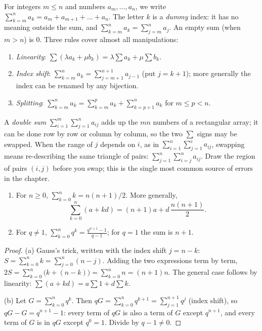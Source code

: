 \begin{reminder}
For integers $m\le n$ and numbers $a_m,\dots,a_n$, we write $\sum_{k=m}^na_k=a_m+a_{m+1}+\dots+a_n$. The letter $k$ is a \emph{dummy} index: it has
no meaning outside the sum, and $\sum_{k=m}^na_k=\sum_{j=m}^na_j$. An empty sum (when $m>n$) is $0$. Three rules cover almost all manipulations:
\begin{enumerate}[label=(\roman*)]
\item \emph{Linearity}: $\sum(\lambda a_k+\mu b_k)=\lambda\sum a_k+\mu\sum b_k$.
\item \emph{Index shift}: $\sum_{k=m}^na_k=\sum_{j=m+1}^{n+1}a_{j-1}$ (put $j=k+1$); more generally the index can be renamed by any bijection.
\item \emph{Splitting}: $\sum_{k=m}^na_k=\sum_{k=m}^pa_k+\sum_{k=p+1}^na_k$ for $m\le p<n$.
\end{enumerate}
A \emph{double sum} $\sum_{i=1}^m\sum_{j=1}^na_{ij}$ adds up the $mn$ numbers of a rectangular array; it can be done row by row or column by column,
so the two $\sum$ signs may be swapped. When the range of $j$ depends on $i$, as in $\sum_{i=1}^n\sum_{j=1}^ia_{ij}$, swapping means re-describing the
same triangle of pairs: $\sum_{j=1}^n\sum_{i=j}^na_{ij}$. Draw the region of pairs $(i,j)$ before you swap; this is the single most common source of
errors in the chapter.
\end{reminder}

\begin{propositionx}
\begin{enumerate}[label=(\alph*)]
\item For $n\ge0$, $\sum_{k=0}^nk=n(n+1)/2$. More generally,
\[
\sum_{k=0}^n(a+kd)=(n+1)a+d\,\frac{n(n+1)}2.
\]
\item For $q\ne1$, $\displaystyle\sum_{k=0}^nq^k=\frac{q^{n+1}-1}{q-1}$; for $q=1$ the sum is $n+1$.
\end{enumerate}
\end{propositionx}
\begin{proof}
(a) Gauss's trick, written with the index shift $j=n-k$: $S=\sum_{k=0}^nk=\sum_{j=0}^n(n-j)$. Adding the two expressions term by term,
$2S=\sum_{k=0}^n\bigl(k+(n-k)\bigr)=\sum_{k=0}^nn=(n+1)n$. The general case follows by linearity: $\sum(a+kd)=a\sum1+d\sum k$.

(b) Let $G=\sum_{k=0}^nq^k$. Then $qG=\sum_{k=0}^nq^{k+1}=\sum_{j=1}^{n+1}q^j$ (index shift), so $qG-G=q^{n+1}-1$: every term of $qG$ is also a term of
$G$ except $q^{n+1}$, and every term of $G$ is in $qG$ except $q^0=1$. Divide by $q-1\ne0$.
\end{proof}

